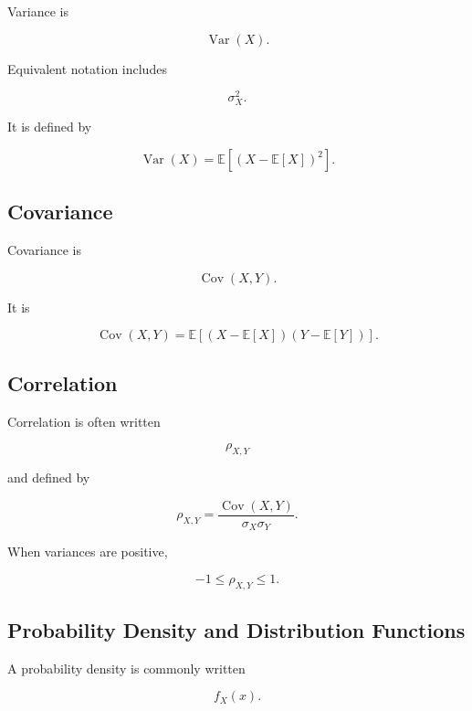 Variance is

\[
\boxed{
\operatorname{Var}(X).
}
\]

Equivalent notation includes

\[
\boxed{
\sigma_X^2.
}
\]

It is defined by

\[
\boxed{
\operatorname{Var}(X)
=
\mathbb{E}
\left[
(X-\mathbb{E}[X])^2
\right].
}
\]

\subsection{Covariance}
\label{subsec:covariance-notation-reference}

Covariance is

\[
\boxed{
\operatorname{Cov}(X,Y).
}
\]

It is

\[
\boxed{
\operatorname{Cov}(X,Y)
=
\mathbb{E}
\left[
(X-\mathbb{E}[X])
(Y-\mathbb{E}[Y])
\right].
}
\]

\subsection{Correlation}
\label{subsec:correlation-notation-reference}

Correlation is often written

\[
\boxed{
\rho_{X,Y}
}
\]

and defined by

\[
\boxed{
\rho_{X,Y}
=
\frac{
\operatorname{Cov}(X,Y)
}{
\sigma_X\sigma_Y
}.
}
\]

When variances are positive,

\[
\boxed{
-1\leq\rho_{X,Y}\leq1.
}
\]

\subsection{Probability Density and Distribution Functions}
\label{subsec:density-distribution-reference}

A probability density is commonly written

\[
\boxed{
f_X(x).
}
\]

